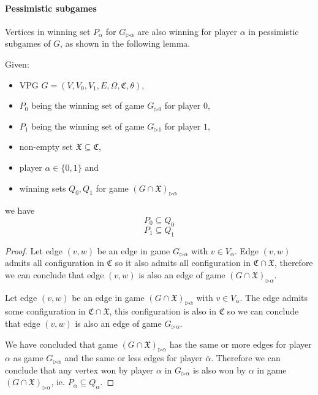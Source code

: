 \paragraph{Pessimistic subgames}
Vertices in winning set $P_\alpha$ for $G_{\triangleright\alpha}$ are also winning for player $\alpha$ in pessimistic subgames of $G$, as shown in the following lemma.
\begin{lemma}
	\label{lem_pessimistic_subgames}
	Given:
	\begin{itemize}
		\item VPG $G = (V,V_0,V_1,E,\Omega, \mathfrak{C},\theta)$,
		\item $P_0$ being the winning set of game $G_{\triangleright0}$ for player $0$,
		\item $P_1$ being the winning set of game $G_{\triangleright1}$ for player $1$,
		\item non-empty set $\mathfrak{X} \subseteq \mathfrak{C}$,
		\item player $\alpha \in \{0,1\}$ and
		\item winning sets $Q_0,Q_1$ for game $(G \cap \mathfrak{X})_{\triangleright\alpha}$
	\end{itemize}
	we have
	\[ P_0 \subseteq Q_0 \]
	\[ P_1 \subseteq Q_1 \]
	\begin{proof}
		
		Let edge $(v,w)$ be an edge in game $G_{\triangleright\alpha}$ with $v \in V_\alpha$. Edge $(v,w)$ admits all configuration in $\mathfrak{C}$ so it also admits all configuration in $\mathfrak{C} \cap \mathfrak{X}$, therefore we can conclude that edge $(v,w)$ is also an edge of game $(G\cap \mathfrak{X})_{\triangleright\alpha}$.
		
		Let edge $(v,w)$ be an edge in game $(G \cap \mathfrak{X})_{\triangleright\alpha}$ with $v \in V_{\overline{\alpha}}$. The edge admits some configuration in $\mathfrak{C} \cap \mathfrak{X}$, this configuration is also in $\mathfrak{C}$ so we can conclude that edge $(v,w)$ is also an edge of game $G_{\triangleright\alpha}$.
		
		We have concluded that game $(G \cap \mathfrak{X})_{\triangleright\alpha}$ has the same or more edges for player $\alpha$ as game $G_{\triangleright\alpha}$ and the same or less edges for player $\overline{\alpha}$. Therefore we can conclude that any vertex won by player $\alpha$ in $G_{\triangleright\alpha}$ is also won by $\alpha$ in game $(G \cap \mathfrak{X})_{\triangleright\alpha}$, ie. $P_\alpha \subseteq Q_\alpha$.
		

\end{proof}
\end{lemma}
